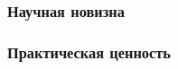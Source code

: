 \documentclass[10pt,utf8]{beamer}
\begin{document}

\begin{frame}
  \frametitle{}


\end{frame}




\begin{frame}
  \frametitle{}


\end{frame}




\begin{frame}
  \frametitle{}


\end{frame}




\begin{frame}
  \frametitle{}


\end{frame}




\begin{frame}
  \frametitle{}


\end{frame}




\begin{frame}
  \frametitle{Научная новизна}


\end{frame}




\begin{frame}
  \frametitle{Практическая ценность}


\end{frame}
\end{document}
